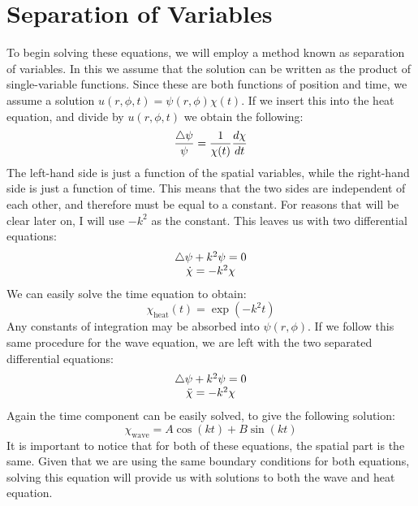 \documentclass{article}
\begin{document}
\section{Separation of Variables}
To begin solving these equations, we will employ a method known as separation of variables. In this we assume that the solution can be written as the product of single-variable functions. Since these are both functions of position and time, we assume a solution $u(r,\phi,t)=\psi(r,\phi)\chi(t)$. If we insert this into the heat equation, and divide by $u(r,\phi,t)$ we obtain the following:
\begin{equation}
  \frac{\bigtriangleup \psi}{\psi} = \frac{1}{\chi(t)}\frac{d \chi}{d t}
\end{equation}
The left-hand side is just a function of the spatial variables, while the right-hand side is just a function of time. This means that the two sides are independent of each other, and therefore must be equal to a constant. For reasons that will be clear later on, I will use $-k^2$ as the constant. This leaves us with two differential equations:
\begin{equation}
  \begin{matrix}
    \bigtriangleup\psi+k^2\psi=0\\
    \dot{\chi}=-k^2 \chi
  \end{matrix}
\end{equation}
We can easily solve the time equation to obtain:
\begin{equation}
  \chi_{\mathrm{heat}}(t)=\exp(-k^2 t)
\end{equation}
Any constants of integration may be absorbed into $\psi(r,\phi)$. If we follow this same procedure for the wave equation, we are left with the two separated differential equations:
\begin{equation}
  \begin{matrix}
    \bigtriangleup\psi+k^2\psi=0\\
    \ddot{\chi}=-k^2 \chi
  \end{matrix}
\end{equation}
Again the time component can be easily solved, to give the following solution:
\begin{equation}
  \chi_{\mathrm{wave}}=A\cos(kt)+B\sin(kt)
\end{equation}
It is important to notice that for both of these equations, the spatial part is the same. Given that we are using the same boundary conditions for both equations, solving this equation will provide us with solutions to both the wave and heat equation.
\end{document}
